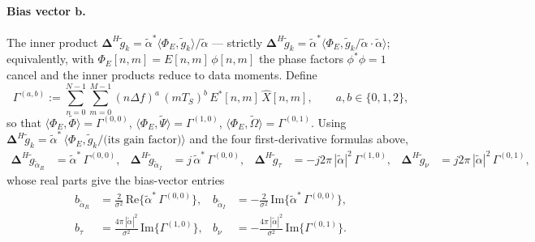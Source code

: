 \documentclass[11pt]{article}
\begin{document}
\paragraph{Bias vector \(\bm{b}\).} The inner product \(\bm{\Delta}^H \tilde{g}_k = \tilde{\alpha}^* \langle \Phi_E, \tilde{g}_k\rangle / \tilde{\alpha}\) — strictly \(\bm{\Delta}^H \tilde{g}_k = \tilde{\alpha}^* \langle \Phi_E, \tilde{g}_k / \tilde{\alpha} \cdot \tilde{\alpha}\rangle\); equivalently, with \(\Phi_E[n,m] = E[n,m]\, \phi[n,m]\) the phase factors \(\phi^*\phi = 1\) cancel and the inner products reduce to data moments. Define
\begin{equation}
    \Gamma^{(a,b)} := \sum_{n=0}^{N-1} \sum_{m=0}^{M-1} (n\Delta f)^a\, (mT_S)^b\, E^*[n,m]\, \hat{X}[n,m], \qquad a, b \in \{0, 1, 2\},
\end{equation}
so that \(\langle \Phi_E, \tilde{\Phi}\rangle = \Gamma^{(0,0)}\), \(\langle \Phi_E, \tilde{\Psi}\rangle = \Gamma^{(1,0)}\), \(\langle \Phi_E, \tilde{\Omega}\rangle = \Gamma^{(0,1)}\). Using \(\bm{\Delta}^H \tilde{g}_k = \tilde{\alpha}^*\, \langle \Phi_E, \tilde{g}_k/\!\!\!\text{(its gain factor)}\rangle\) and the four first-derivative formulas above,
\begin{align}
    \bm{\Delta}^H \tilde{g}_{\tilde{\alpha}_R} &= \tilde{\alpha}^*\, \Gamma^{(0,0)}, &
    \bm{\Delta}^H \tilde{g}_{\tilde{\alpha}_I} &= j\, \tilde{\alpha}^*\, \Gamma^{(0,0)}, &
    \bm{\Delta}^H \tilde{g}_\tau &= -j2\pi\, |\tilde{\alpha}|^2\, \Gamma^{(1,0)}, &
    \bm{\Delta}^H \tilde{g}_\nu &= j2\pi\, |\tilde{\alpha}|^2\, \Gamma^{(0,1)},
\end{align}
whose real parts give the bias-vector entries
\begin{align}
    b_{\tilde{\alpha}_R} &= \tfrac{2}{\sigma^2}\, \mathrm{Re}\{\tilde{\alpha}^*\, \Gamma^{(0,0)}\}, &
    b_{\tilde{\alpha}_I} &= -\tfrac{2}{\sigma^2}\, \mathrm{Im}\{\tilde{\alpha}^*\, \Gamma^{(0,0)}\}, \\
    b_\tau &= \tfrac{4\pi\, |\tilde{\alpha}|^2}{\sigma^2}\, \mathrm{Im}\{\Gamma^{(1,0)}\}, &
    b_\nu &= -\tfrac{4\pi\, |\tilde{\alpha}|^2}{\sigma^2}\, \mathrm{Im}\{\Gamma^{(0,1)}\}.
\end{align}
\end{document}
